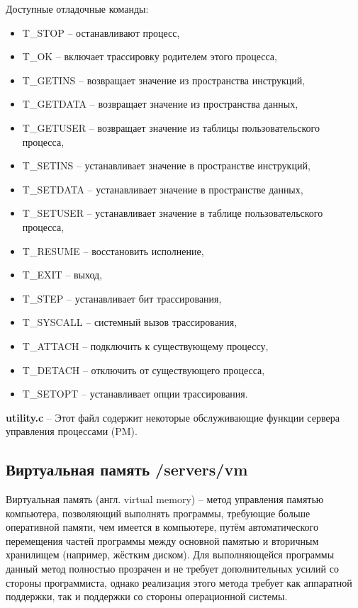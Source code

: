 Доступные отладочные команды:
\begin{itemize}
\item T\_STOP -- останавливают процесс,
\item T\_OK -- включает трассировку родителем этого процесса,
\item T\_GETINS -- возвращает значение из пространства инструкций,
\item T\_GETDATA -- возвращает значение из пространства данных,
\item T\_GETUSER -- возвращает значение из таблицы пользовательского процесса,
\item T\_SETINS -- устанавливает значение в пространстве инструкций,
\item T\_SETDATA -- устанавливает значение в пространстве данных,
\item T\_SETUSER -- устанавливает значение в таблице пользовательского процесса,
\item T\_RESUME -- восстановить исполнение,
\item T\_EXIT -- выход,
\item T\_STEP -- устанавливает бит трассирования,
\item T\_SYSCALL -- системный вызов трассирования,
\item T\_ATTACH -- подключить к существующему процессу,
\item T\_DETACH -- отключить от существующего процесса,
\item T\_SETOPT -- устанавливает опции трассирования.
\end{itemize}

\textbf{utility.c} -- Этот файл содержит некоторые обслуживающие функции сервера управления процессами (PM).

\subsection{Виртуальная память /servers/vm}

Виртуальная память (англ. virtual memory) -- метод управления памятью компьютера, позволяющий выполнять программы, требующие больше оперативной памяти, чем имеется в компьютере, путём автоматического перемещения частей программы между основной памятью и вторичным хранилищем (например, жёстким диском). Для выполняющейся программы данный метод полностью прозрачен и не требует дополнительных усилий со стороны программиста, однако реализация этого метода требует как аппаратной поддержки, так и поддержки со стороны операционной системы.

